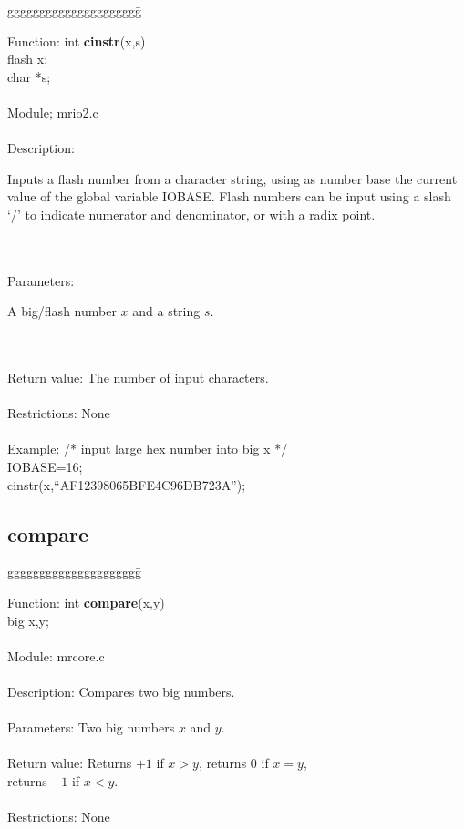 \begin{tabbing}
ggggggggggggggggggggg\= \kill

      Function:      \>int {\bf cinstr}(x,s) \\
                     \>flash x; \\
                     \>char *s; \\
      \ \\
      Module;        \>mrio2.c \\
      \ \\
      Description:   \>
                     \parbox[t]{3 in}
                     {Inputs a flash number from a character string, using as
                      number base the current value of the global variable 
                      IOBASE. Flash numbers can be input using a slash `/' to
                      indicate numerator and denominator, or with a radix 
                      point.} \\
      \ \\
      Parameters:     \>
                      \parbox[t]{3 in}
                      {A big/flash number $x$ and a string $s$. } \\
      \ \\
      Return value:   \>The number of input characters. \\
      \ \\
      Restrictions:   \>None \\
      \ \\
      Example:        \>/* input large hex number into big x */ \\
                      \>IOBASE=16; \\
                      \>cinstr(x,``AF12398065BFE4C96DB723A'');\\
\end{tabbing}
              
 
\subsection{compare}

\begin{tabbing}
ggggggggggggggggggggg\= \kill

      Function:      \>int {\bf compare}(x,y)  \\
                     \>big x,y;  \\
\ \\
      Module:        \>mrcore.c    \\
\ \\
      Description:   \>Compares two big numbers.    \\
      \ \\
      Parameters:    \>Two big numbers $x$ and $y$.  \\
      \ \\
      Return value:  \>Returns $+1$ if $x>y$, returns 0 if $x=y$, \\
                     \>returns $-1$ if $x<y$.\\
      \ \\
      Restrictions:  \>None        \\

\end{tabbing}
\pagebreak
